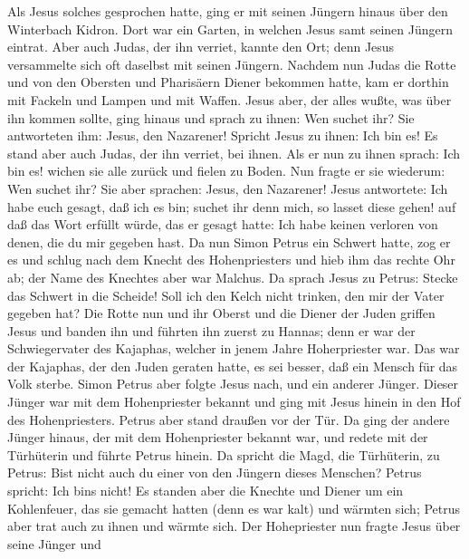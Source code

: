  Als Jesus solches gesprochen hatte, ging er mit seinen
Jüngern hinaus über den Winterbach Kidron. Dort war ein Garten, in
welchen Jesus samt seinen Jüngern eintrat.  Aber auch
Judas, der ihn verriet, kannte den Ort; denn Jesus versammelte sich oft
daselbst mit seinen Jüngern.  Nachdem nun Judas die Rotte
und von den Obersten und Pharisäern Diener bekommen hatte, kam er
dorthin mit Fackeln und Lampen und mit Waffen.  Jesus
aber, der alles wußte, was über ihn kommen sollte, ging hinaus und
sprach zu ihnen: Wen suchet ihr?  Sie antworteten ihm:
Jesus, den Nazarener! Spricht Jesus zu ihnen: Ich bin es! Es stand aber
auch Judas, der ihn verriet, bei ihnen.  Als er nun zu
ihnen sprach: Ich bin es! wichen sie alle zurück und fielen zu Boden.
 Nun fragte er sie wiederum: Wen suchet ihr? Sie aber
sprachen: Jesus, den Nazarener!  Jesus antwortete: Ich
habe euch gesagt, daß ich es bin; suchet ihr denn mich, so lasset diese
gehen!  auf daß das Wort erfüllt würde, das er gesagt
hatte: Ich habe keinen verloren von denen, die du mir gegeben hast.
 Da nun Simon Petrus ein Schwert hatte, zog er es und
schlug nach dem Knecht des Hohenpriesters und hieb ihm das rechte Ohr
ab; der Name des Knechtes aber war Malchus.  Da sprach
Jesus zu Petrus: Stecke das Schwert in die Scheide! Soll ich den Kelch
nicht trinken, den mir der Vater gegeben hat?  Die Rotte
nun und ihr Oberst und die Diener der Juden griffen Jesus und banden ihn
 und führten ihn zuerst zu Hannas; denn er war der
Schwiegervater des Kajaphas, welcher in jenem Jahre Hoherpriester war.
 Das war der Kajaphas, der den Juden geraten hatte, es
sei besser, daß ein Mensch für das Volk sterbe.  Simon
Petrus aber folgte Jesus nach, und ein anderer Jünger. Dieser Jünger war
mit dem Hohenpriester bekannt und ging mit Jesus hinein in den Hof des
Hohenpriesters.  Petrus aber stand draußen vor der Tür.
Da ging der andere Jünger hinaus, der mit dem Hohenpriester bekannt war,
und redete mit der Türhüterin und führte Petrus hinein. 
Da spricht die Magd, die Türhüterin, zu Petrus: Bist nicht auch du einer
von den Jüngern dieses Menschen? Petrus spricht: Ich
bin\textquotesingle s nicht!  Es standen aber die Knechte
und Diener um ein Kohlenfeuer, das sie gemacht hatten (denn es war kalt)
und wärmten sich; Petrus aber trat auch zu ihnen und wärmte sich.
 Der Hohepriester nun fragte Jesus über seine Jünger und
